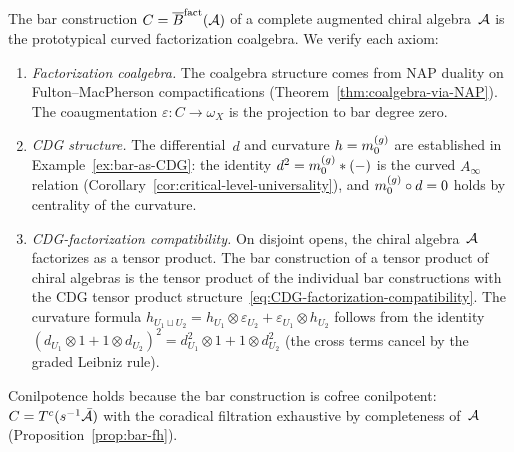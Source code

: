 \begin{example}
\label{ex:bar-fact-CDG}
The bar construction
$C = \overline{B}^{\mathrm{fact}}(\mathcal{A})$ of a complete augmented chiral
algebra~$\mathcal{A}$ is the prototypical curved factorization coalgebra.
We verify each axiom:
\begin{enumerate}[label=\textup{(\roman*)}]
\item \emph{Factorization coalgebra.}
  The coalgebra structure comes from NAP duality on
  Fulton--MacPherson compactifications
  (Theorem~\ref{thm:coalgebra-via-NAP}).  The coaugmentation
  $\varepsilon \colon C \to \omega_X$ is the projection to bar
  degree zero.
\item \emph{CDG structure.}
  The differential~$d$ and curvature
  $h = m_0^{(g)}$ are established in
  Example~\ref{ex:bar-as-CDG}: the identity
  $d^2 = m_0^{(g)} \ast (-)$ is the curved $A_\infty$ relation
  (Corollary~\ref{cor:critical-level-universality}), and
  $m_0^{(g)} \circ d = 0$ holds by centrality of the curvature.
\item \emph{CDG-factorization compatibility.}
  On disjoint opens, the chiral algebra~$\mathcal{A}$ factorizes as a
  tensor product.  The bar construction of a tensor product of
  chiral algebras is the tensor product of the individual bar
  constructions with the CDG tensor product
  structure~\eqref{eq:CDG-factorization-compatibility}.  The
  curvature formula
  $h_{U_1 \sqcup U_2} = h_{U_1} \otimes \varepsilon_{U_2}
  + \varepsilon_{U_1} \otimes h_{U_2}$
  follows from the identity
  $(d_{U_1} \otimes 1 + 1 \otimes d_{U_2})^2
  = d_{U_1}^2 \otimes 1 + 1 \otimes d_{U_2}^2$
  (the cross terms cancel by the graded Leibniz rule).
\end{enumerate}
Conilpotence holds because the bar construction is cofree
conilpotent: $C = T^c(s^{-1}\bar{\mathcal{A}})$ with the coradical
filtration exhaustive by completeness of~$\mathcal{A}$
(Proposition~\ref{prop:bar-fh}).
\end{example}

